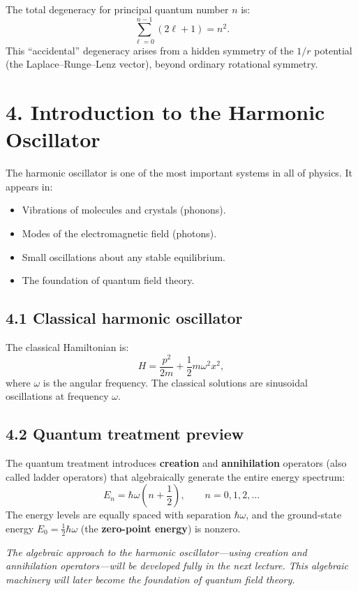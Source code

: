 \documentclass[12pt,a4paper]{article}
\begin{document}
The total degeneracy for principal quantum number $n$ is:
\[
    \sum_{\ell=0}^{n-1}(2\ell+1) = n^2.
\]
This ``accidental'' degeneracy arises from a hidden symmetry of the $1/r$ potential (the Laplace--Runge--Lenz vector), beyond ordinary rotational symmetry.

\section{4. Introduction to the Harmonic Oscillator}

The harmonic oscillator is one of the most important systems in all of physics.  It appears in:
\begin{itemize}[nosep]
    \item Vibrations of molecules and crystals (phonons).
    \item Modes of the electromagnetic field (photons).
    \item Small oscillations about any stable equilibrium.
    \item The foundation of quantum field theory.
\end{itemize}

\subsection{4.1 Classical harmonic oscillator}

The classical Hamiltonian is:
\[
    H = \frac{p^2}{2m} + \frac{1}{2}m\omega^2 x^2,
\]
where $\omega$ is the angular frequency.  The classical solutions are sinusoidal oscillations at frequency $\omega$.

\subsection{4.2 Quantum treatment preview}

The quantum treatment introduces \textbf{creation} and \textbf{annihilation} operators (also called ladder operators) that algebraically generate the entire energy spectrum:
\[
    E_n = \hbar\omega\left(n + \frac{1}{2}\right), \qquad n = 0, 1, 2, \ldots
\]
The energy levels are equally spaced with separation $\hbar\omega$, and the ground-state energy $E_0 = \tfrac{1}{2}\hbar\omega$ (the \textbf{zero-point energy}) is nonzero.

\medskip
\noindent\textit{The algebraic approach to the harmonic oscillator---using creation and annihilation operators---will be developed fully in the next lecture.  This algebraic machinery will later become the foundation of quantum field theory.}
\end{document}
